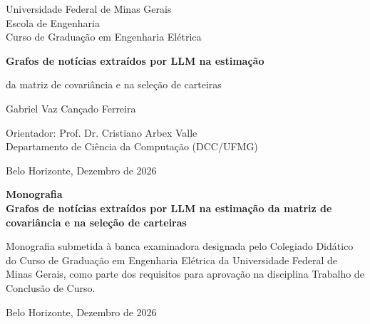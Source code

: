 \begin{titlepage}
\begin{center}
{\large Universidade Federal de Minas Gerais\\
Escola de Engenharia \\
Curso de Graduação em Engenharia Elétrica\\}

\vspace{6cm}
{\bf\Large Grafos de notícias extraídos por LLM na estimação\vspace{0.2cm}

da matriz de covariância e na seleção de carteiras}
\vspace{4cm}

{\large Gabriel Vaz Cançado Ferreira}
\vspace{2cm}  
   
\vspace{2cm}          
{\large Orientador: Prof. Dr. Cristiano Arbex Valle}\\
{\large Departamento de Ciência da Computação (DCC/UFMG)}

\vfill
{\large Belo Horizonte, Dezembro de 2026 }
\end{center}

\end{titlepage}

\newpage
\clearpage
\thispagestyle{empty}


\begin{titlepage}

\centering
\textbf{Monografia}\\
\vspace{2cm}
\centering
\textbf{Grafos de notícias extraídos por LLM na estimação da matriz de covariância e na seleção de carteiras}\\
\vspace{5cm} 

\parbox{1.0\textwidth} 
{\large 
Monografia submetida à banca examinadora
designada pelo Colegiado Didático do Curso de
Graduação em Engenharia Elétrica da Universidade Federal de Minas
Gerais, como parte dos requisitos para aprovação na
disciplina Trabalho de Conclusão de Curso.}

\vspace{7cm} 
\centering
Belo Horizonte, Dezembro de 2026

\end{titlepage}

